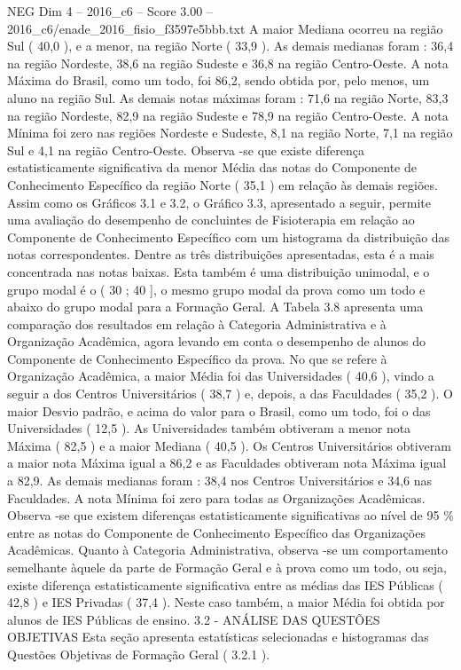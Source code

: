 \begin{textsample}{NEG Dim 4 – 2016\_c6 – Score 3.00 – 2016\_c6/enade\_2016\_fisio\_f3597e5bbb.txt}
A maior Mediana ocorreu na região Sul ( 40,0 ), e a menor, na região Norte ( 33,9 ).
As demais medianas foram : 36,4 na região Nordeste, 38,6 na região Sudeste e 36,8 na região Centro-Oeste.
A nota Máxima do Brasil, como um todo, foi 86,2, sendo obtida por, pelo menos, um aluno na região Sul.
As demais notas máximas foram : 71,6 na região Norte, 83,3 na região Nordeste, 82,9 na região Sudeste e 78,9 na região Centro-Oeste.
A nota Mínima foi zero nas regiões Nordeste e Sudeste, 8,1 na região Norte, 7,1 na região Sul e 4,1 na região Centro-Oeste.
Observa -se que existe diferença estatisticamente significativa da menor Média das notas do Componente de Conhecimento Específico da região Norte ( 35,1 ) em relação às demais regiões.
Assim como os Gráficos 3.1 e 3.2, o Gráfico 3.3, apresentado a seguir, permite uma avaliação do desempenho de concluintes de Fisioterapia em relação ao Componente de Conhecimento Específico com um histograma da distribuição das notas correspondentes.
Dentre as três distribuições apresentadas, esta é a mais concentrada nas notas baixas.
Esta também é uma distribuição unimodal, e o grupo modal é o ( 30 ; 40 ], o mesmo grupo modal da prova como um todo e abaixo do grupo modal para a Formação Geral.
A Tabela 3.8 apresenta uma comparação dos resultados em relação à Categoria Administrativa e à Organização Acadêmica, agora levando em conta o desempenho de alunos do Componente de Conhecimento Específico da prova.
No que se refere à Organização Acadêmica, a maior Média foi das Universidades ( 40,6 ), vindo a seguir a dos Centros Universitários ( 38,7 ) e, depois, a das Faculdades ( 35,2 ).
O maior Desvio padrão, e acima do valor para o Brasil, como um todo, foi o das Universidades ( 12,5 ).
As Universidades também obtiveram a menor nota Máxima ( 82,5 ) e a maior Mediana ( 40,5 ).
Os Centros Universitários obtiveram a maior nota Máxima igual a 86,2 e as Faculdades obtiveram nota Máxima igual a 82,9.
As demais medianas foram : 38,4 nos Centros Universitários e 34,6 nas Faculdades.
A nota Mínima foi zero para todas as Organizações Acadêmicas.
Observa -se que existem diferenças estatisticamente significativas ao nível de 95 \% entre as notas do Componente de Conhecimento Específico das Organizações Acadêmicas.
Quanto à Categoria Administrativa, observa -se um comportamento semelhante àquele da parte de Formação Geral e à prova como um todo, ou seja, existe diferença estatisticamente significativa entre as médias das IES Públicas ( 42,8 ) e IES Privadas ( 37,4 ).
Neste caso também, a maior Média foi obtida por alunos de IES Públicas de ensino. 3.2 - ANÁLISE DAS QUESTÕES OBJETIVAS Esta seção apresenta estatísticas selecionadas e histogramas das Questões Objetivas de Formação Geral ( 3.2.1 ).

\end{textsample}
